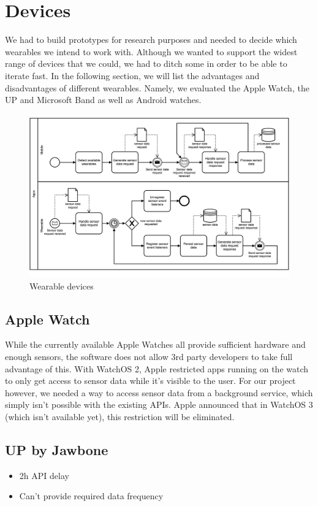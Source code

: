\section{Devices}
\label{sec:devices}

We had to build prototypes for research purposes and needed to decide which wearables we intend to work with.
Although we wanted to support the widest range of devices that we could, we had to ditch some in order to be able to iterate fast.
In the following section, we will list the advantages and disadvantages of different wearables.
Namely, we evaluated the Apple Watch, the UP and Microsoft Band as well as Android watches.

\begin{figure}[H]
	\includegraphics[width=\linewidth]{diagrams/apps.png}
	\caption[Caption for devices]{Wearable devices}
	\label{fig:devices}
\end{figure}

\subsection{Apple Watch}
While the currently available Apple Watches all provide sufficient hardware and enough sensors, the software does not allow 3rd party developers to take full advantage of this.
With WatchOS 2, Apple restricted apps running on the watch to only get access to sensor data while it's visible to the user.
For our project however, we needed a way to access sensor data from a background service, which simply isn't possible with the existing APIs.
Apple announced that in WatchOS 3 (which isn't available yet), this restriction will be eliminated. 

\subsection{UP by Jawbone}
\begin{itemize}[noitemsep]
	\item 2h API delay
	\item Can't provide required data frequency
\end{itemize}

